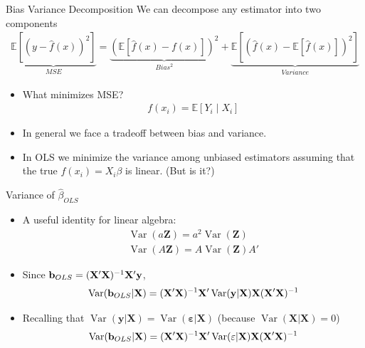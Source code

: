 \begin{frame}{Bias Variance Decomposition}
We can decompose any estimator into two components
\begin{eqnarray*}
\underbrace{\mathbb{E}[(y- \hat{f}(x))^2]}_{MSE} =\underbrace{\left( \mathbb{E}[ \hat{f}(x) - f(x)] \right)^2}_{Bias^2}  +  \underbrace{\mathbb{E} \left[ \left(  \hat{f}(x) - \mathbb{E}[\hat{f}(x)]  \right)^2 \right]}_{Variance} 
\end{eqnarray*}
\begin{itemize}
\item What minimizes MSE?
\begin{eqnarray*}
f(x_i) = \mathbb{E}[Y_i \mid X_i]  
\end{eqnarray*}
\item In general we face a tradeoff between bias and variance.
\item In OLS we minimize the variance among unbiased estimators assuming that the true $f(x_i)= X_i \beta$ is linear. (But is it?)
\end{itemize}
\end{frame}


\begin{frame}{Variance of $\widehat{\beta}_{OLS}$}
\begin{itemize}
	\item A useful identity for linear algebra:
\begin{align*}
\operatorname { Var } (a \mathbf{Z} ) = a^2 \operatorname { Var }(\mathbf{Z})\\
\operatorname { Var } (A \mathbf{Z} ) = A \operatorname { Var }(\mathbf{Z}) A'
\end{align*}

\smallskip
\item Since ${\bf b}_{OLS} = ({\bf X} '{\bf X} )^{-1} {\bf X} '{\bf y}$,
\[
\operatorname { Var } ({\bf b}_{OLS} | {\bf X}) = ({\bf X} '{\bf X} )^{-1} {\bf X}' \operatorname { Var } ({\bf y} | {\bf X})  {\bf X}  ({\bf X} '{\bf X} )^{-1}
\]

\smallskip
\item Recalling that $\operatorname { Var } ( \mathbf{y} |\mathbf{X} )  = \operatorname { Var } ( \mathbf{\varepsilon} | \mathbf { X } ) $ (because $\operatorname { Var } ( \mathbf{X} |\mathbf{X})=0$)
\[
\operatorname { Var } ({\bf b}_{OLS} | {\bf X}) = ({\bf X} '{\bf X} )^{-1} {\bf X}' \operatorname { Var } ( \mathbf{\varepsilon} | \mathbf { X } )  {\bf X}  ({\bf X} '{\bf X} )^{-1}
\]
\end{itemize}
\end{frame}




